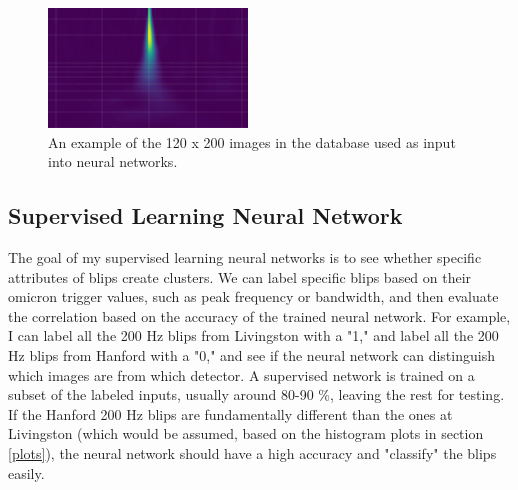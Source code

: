 \documentclass[a4paper]{article}
\begin{document}
\begin{figure}[h!]
	\centering
	\includegraphics[width=.4\linewidth]{image}
	\caption{An example of the 120 x 200 images in the database used as input into neural networks.}
	\label{fig:image}
\end{figure}

\subsection{Supervised Learning Neural Network} \label{section:sup}

The goal of my supervised learning neural networks is to see whether specific attributes of blips create clusters. We can label specific blips based on their omicron trigger values, such as peak frequency or bandwidth, and then evaluate the correlation based on the accuracy of the trained neural network. For example, I can label all the 200 Hz blips from Livingston with a "1," and label all the 200 Hz blips from Hanford with a "0," and see if the neural network can distinguish which images are from which detector. A supervised network is trained on a subset of the labeled inputs, usually around 80-90 \%, leaving the rest for testing. If the Hanford 200 Hz blips are fundamentally different than the ones at Livingston (which would be assumed, based on the histogram plots in section \ref{plots}), the neural network should have a high accuracy and "classify" the blips easily.
\end{document}
